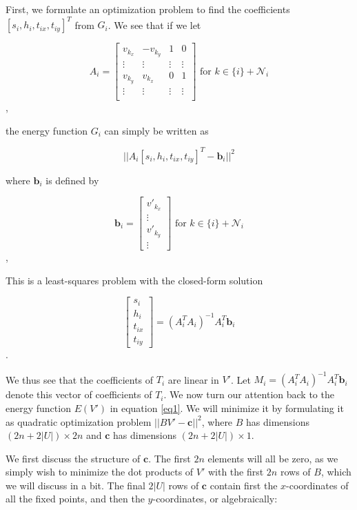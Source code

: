 \documentclass[english]{article}
\begin{document}
First, we formulate an optimization problem to find the coefficients $[s_i, h_i, t_{ix}, t_{iy}]^T$ from $G_i$. We see that if we let

\[
A_i = \begin{bmatrix}
  v_{k_x} & -v_{k_y} & 1 & 0 \\
  \vdots &  \vdots & \vdots & \vdots \\
  v_{k_y} &  v_{k_x} & 0 & 1 \\
  \vdots &  \vdots & \vdots & \vdots \\
\end{bmatrix}
\text{ for } k \in \{i\} + \mathcal{N}_i
\],

the energy function $G_i$ can simply be written as

\[
||A_i[s_i, h_i, t_{ix}, t_{iy}]^T - \mathbf{b}_i||^2
\]

where $\mathbf{b}_i$ is defined by

\[
\mathbf{b}_i = \begin{bmatrix}
  v'_{k_x} \\
  \vdots \\
  v'_{k_y} \\
  \vdots
\end{bmatrix}
\text{ for } k \in \{i\} + \mathcal{N}_i
\],

This is a least-squares problem with the closed-form solution

\[
\begin{bmatrix}
  s_i \\
  h_i \\
  t_{ix} \\
  t_{iy}
\end{bmatrix}
= (A_i^TA_i)^{-1}A_i^T\mathbf{b}_i
\].

We thus see that the coefficients of $T_i$ are linear in $V'$. Let $M_i = (A_i^TA_i)^{-1}A_i^T\mathbf{b}_i$ denote this vector of coefficients of $T_i$. We now turn our attention back to the energy function $E(V')$ in equation \ref{eq1}. We will minimize it by formulating it as quadratic optimization problem $||BV' - \mathbf{c}||^2$, where $B$ has dimensions $(2n + 2|U|) \times 2n$ and $\mathbf{c}$ has dimensions $(2n + 2|U|) \times 1$.

We first discuss the structure of $\mathbf{c}$. The first $2n$ elements will all be zero, as we simply wish to minimize the dot products of $V'$ with the first $2n$ rows of $B$, which we will discuss in a bit. The final $2|U|$ rows of $\mathbf{c}$ contain first the $x$-coordinates of all the fixed points, and then the $y$-coordinates, or algebraically:
\end{document}
